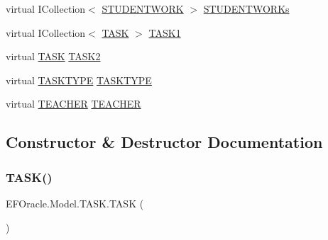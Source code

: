 \begin{DoxyCompactItemize}
\item 
virtual I\+Collection$<$ \hyperlink{class_e_f_oracle_1_1_model_1_1_s_t_u_d_e_n_t_w_o_r_k}{S\+T\+U\+D\+E\+N\+T\+W\+O\+RK} $>$ \hyperlink{class_e_f_oracle_1_1_model_1_1_t_a_s_k_ac5c18bc0239b243fc3a6619e0d07f9dc}{S\+T\+U\+D\+E\+N\+T\+W\+O\+R\+Ks}
\item 
virtual I\+Collection$<$ \hyperlink{class_e_f_oracle_1_1_model_1_1_t_a_s_k}{T\+A\+SK} $>$ \hyperlink{class_e_f_oracle_1_1_model_1_1_t_a_s_k_aa64c090b8ed7dcd11eca669480f18f0a}{T\+A\+S\+K1}
\item 
virtual \hyperlink{class_e_f_oracle_1_1_model_1_1_t_a_s_k}{T\+A\+SK} \hyperlink{class_e_f_oracle_1_1_model_1_1_t_a_s_k_a343ac8c552455467ed8c0747dc948e53}{T\+A\+S\+K2}
\item 
virtual \hyperlink{class_e_f_oracle_1_1_model_1_1_t_a_s_k_t_y_p_e}{T\+A\+S\+K\+T\+Y\+PE} \hyperlink{class_e_f_oracle_1_1_model_1_1_t_a_s_k_af602031657625789573206a1940aeb7e}{T\+A\+S\+K\+T\+Y\+PE}
\item 
virtual \hyperlink{class_e_f_oracle_1_1_model_1_1_t_e_a_c_h_e_r}{T\+E\+A\+C\+H\+ER} \hyperlink{class_e_f_oracle_1_1_model_1_1_t_a_s_k_a1cf92eac8ee113c6eb63db571e0e52b6}{T\+E\+A\+C\+H\+ER}
\end{DoxyCompactItemize}


\subsection{Constructor \& Destructor Documentation}
\mbox{\label{class_e_f_oracle_1_1_model_1_1_t_a_s_k_a8ac2d630efc4ee5359cdb60f198c25cb}} 
\subsubsection{\texorpdfstring{T\+A\+S\+K()}{TASK()}}
{\footnotesize\ttfamily E\+F\+Oracle.\+Model.\+T\+A\+S\+K.\+T\+A\+SK (\begin{DoxyParamCaption}{ }\end{DoxyParamCaption})}



